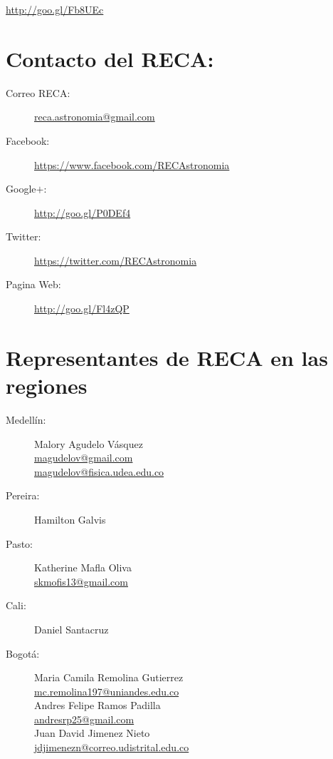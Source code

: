 \documentclass{book}
\begin{document}
\begin{center}
\url{http://goo.gl/Fb8UEc}
\end{center}


\section*{Contacto del RECA:}

\begin{description}
\item[Correo RECA:]\url{reca.astronomia@gmail.com}
\item[Facebook:] \url{https://www.facebook.com/RECAstronomia}
\item[Google$+$:] \url{http://goo.gl/P0DEf4}
\item[Twitter:] \url{https://twitter.com/RECAstronomia}
\item[Pagina Web:] \url{http://goo.gl/Fl4zQP}
\end{description}


\section*{Representantes de RECA en las regiones}
\begin{description}
\item[Medellín:]Malory Agudelo Vásquez\\
\url{magudelov@gmail.com}\\ \url{magudelov@fisica.udea.edu.co}
\item[Pereira:]Hamilton Galvis
\item[Pasto:]Katherine Mafla Oliva\\
\url{skmofis13@gmail.com}
\item[Cali:]Daniel Santacruz
\item[Bogotá:]Maria Camila Remolina Gutierrez\\
\url{mc.remolina197@uniandes.edu.co}\\

Andres Felipe Ramos Padilla\\
\url{andresrp25@gmail.com}\\

Juan David Jimenez Nieto\\
\url{jdjimenezn@correo.udistrital.edu.co}
\end{description}
\end{document}
